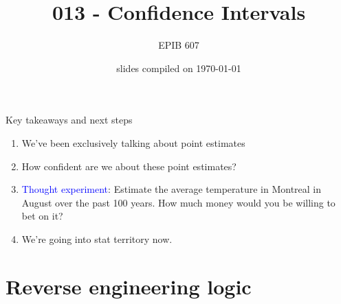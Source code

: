 \documentclass[10pt,handout]{beamer}\usepackage[]{graphicx}\usepackage[]{color}
\begin{document}
	
	
	
	
	\title{013 - Confidence Intervals}
	\author{EPIB 607}
	
	\date{slides compiled on \today}
	
	\maketitle

\begin{frame}{Key takeaways and next steps}
	\begin{enumerate}
		\setlength\itemsep{2em}
		\item We've been exclusively talking about point estimates \pause
		\item How confident are we about these point estimates? \pause
		\item \textcolor{blue}{Thought experiment}: Estimate the average temperature in Montreal in August over the past 100 years. How much money would you be willing to bet on it?\pause  
		\item We're going into stat territory now. 
	\end{enumerate}
\end{frame}





\section{Reverse engineering logic}
\end{document}
